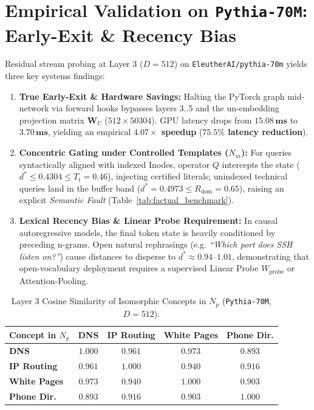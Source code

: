 \documentclass[10pt,twocolumn]{article}
\theoremstyle{definition}
\begin{document}
\section{Empirical Validation on \texttt{Pythia-70M}: Early-Exit \& Recency Bias}
Residual stream probing at Layer 3 ($D=512$) on \texttt{EleutherAI/pythia-70m} yields three key systems findings:
\begin{enumerate}[leftmargin=*, itemsep=1.5pt]
    \item \textbf{True Early-Exit \& Hardware Savings:} Halting the PyTorch graph mid-network via forward hooks bypasses layers 3..5 and the un-embedding projection matrix $\mathbf{W}_U$ ($512 \times 50304$). GPU latency drops from $\mathbf{15.08\,\text{ms}}$ to $\mathbf{3.70\,\text{ms}}$, yielding an empirical \textbf{$4.07\times$ speedup} (\textbf{$75.5\%$ latency reduction}).
    \item \textbf{Concentric Gating under Controlled Templates ($N_m$):} For queries syntactically aligned with indexed Inodes, operator $Q$ intercepts the state ($d^* \le 0.4304 \le T_t = 0.46$), injecting certified literals; unindexed technical queries land in the buffer band ($d^* = 0.4973 \le R_{\mathrm{dom}} = 0.65$), raising an explicit \textit{Semantic Fault} (Table~\ref{tab:factual_benchmark}).
    \item \textbf{Lexical Recency Bias \& Linear Probe Requirement:} In causal autoregressive models, the final token state is heavily conditioned by preceding n-grams. Open natural rephrasings (e.g. \textit{``Which port does SSH listen on?''}) cause distances to disperse to $d^* \approx 0.94\text{--}1.01$, demonstrating that open-vocabulary deployment requires a supervised Linear Probe $W_{\mathrm{probe}}$ or Attention-Pooling.
\end{enumerate}

\begin{table}[t]
\centering
\caption{Layer 3 Cosine Similarity of Isomorphic Concepts in $N_p$ (\texttt{Pythia-70M}, $D=512$).}
\label{tab:pythia}
\vspace{0.1cm}
\scriptsize
\setlength{\tabcolsep}{2.5pt}
\begin{tabular}{@{}lcccc@{}}
\toprule
\textbf{Concept in $N_p$} & \textbf{DNS} & \textbf{IP Routing} & \textbf{White Pages} & \textbf{Phone Dir.} \\ \midrule
\textbf{DNS} & $1.000$ & $0.961$ & $0.973$ & $0.893$ \\
\textbf{IP Routing} & $0.961$ & $1.000$ & $0.940$ & $0.916$ \\
\textbf{White Pages} & $0.973$ & $0.940$ & $1.000$ & $0.903$ \\
\textbf{Phone Dir.} & $0.893$ & $0.916$ & $0.903$ & $1.000$ \\ \bottomrule
\end{tabular}
\end{table}
\end{document}
